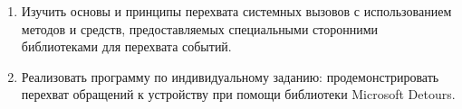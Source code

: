 \renewcommand{\labelenumii}{\theenumii}
\renewcommand{\theenumii}{\theenumi.\arabic{enumii}.}

\begin{enumerate}
	\item Изучить основы и принципы перехвата системных вызовов с использованием методов и средств, предоставляемых специальными сторонними библиотеками для перехвата событий.
	\item Реализовать программу по индивидуальному заданию: продемонстрировать перехват обращений к устройству при помощи библиотеки Microsoft Detours.
\end{enumerate}
